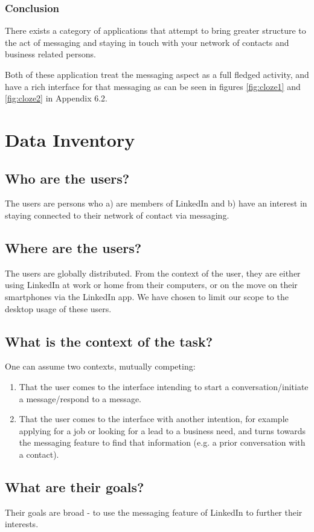 \documentclass[
	letterpaper, %
]{jdf}
\begin{document}
\subsubsection{Conclusion}
There exists a category of applications that attempt to bring greater structure to the act of messaging and staying in touch with your network of contacts and business related persons.

Both of these application treat the messaging aspect as a full fledged activity, and have a rich interface for that messaging as can be seen in figures \ref{fig:cloze1} and \ref{fig:cloze2} in Appendix 6.2.

\section{Data Inventory}
\subsection{Who are the users?}
The users are persons who a) are members of LinkedIn and b) have an interest in staying connected to their network of contact via messaging.
\subsection{Where are the users?}
The users are globally distributed. From the context of the user, they are either using LinkedIn at work or home from their computers, or on the move on their smartphones via the LinkedIn app. We have chosen to limit our scope to the desktop usage of these users.
\subsection{What is the context of the task?}
One can assume two contexts, mutually competing:
\begin{enumerate}
    \item That the user comes to the interface intending to start a conversation/initiate a message/respond to a message.
    \item That the user comes to the interface with another intention, for example applying for a job or looking for a lead to a business need, and turns towards the messaging feature to find that information (e.g. a prior conversation with a contact).
\end{enumerate}

\subsection{What are their goals?}
Their goals are broad - to use the messaging feature of LinkedIn to further their interests.
\end{document}

